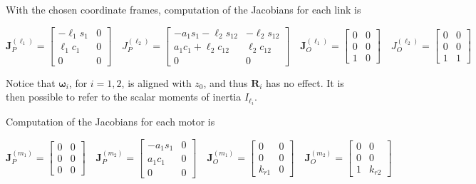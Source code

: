 \documentclass[10pt]{article}
\begin{document}
With the chosen coordinate frames, computation of the Jacobians for each link is

$$
\boldsymbol{J}_{P}^{\left(\ell_{1}\right)}=\left[\begin{array}{cc}
-\ell_{1} s_{1} & 0 \\
\ell_{1} c_{1} & 0 \\
0 & 0
\end{array}\right] \quad J_{P}^{\left(\ell_{2}\right)}=\left[\begin{array}{cc}
-a_{1} s_{1}-\ell_{2} s_{12} & -\ell_{2} s_{12} \\
a_{1} c_{1}+\ell_{2} c_{12} & \ell_{2} c_{12} \\
0 & 0
\end{array}\right]
\quad
\boldsymbol{J}_{O}^{\left(\ell_{1}\right)}=\left[\begin{array}{ll}
0 & 0 \\
0 & 0 \\
1 & 0
\end{array}\right] \quad J_{O}^{\left(\ell_{2}\right)}=\left[\begin{array}{ll}
0 & 0 \\
0 & 0 \\
1 & 1
\end{array}\right]
$$

Notice that $\boldsymbol{\omega}_{i}$, for $i=1,2$, is aligned with $z_{0}$, and thus $\boldsymbol{R}_{i}$ has no effect. It is then possible to refer to the scalar moments of inertia $I_{\ell_{i}}$.

Computation of the Jacobians for each motor is

$$
\boldsymbol{J}_{P}^{\left(m_{1}\right)}=\left[\begin{array}{cc}
0 & 0 \\
0 & 0 \\
0 & 0
\end{array}\right] \quad \boldsymbol{J}_{P}^{\left(m_{2}\right)}=\left[\begin{array}{cc}
-a_{1} s_{1} & 0 \\
a_{1} c_{1} & 0 \\
0 & 0
\end{array}\right]\quad
\boldsymbol{J}_{O}^{\left(m_{1}\right)}=\left[\begin{array}{cc}
0 & 0 \\
0 & 0 \\
k_{r 1} & 0
\end{array}\right] \quad \boldsymbol{J}_{O}^{\left(m_{2}\right)}=\left[\begin{array}{cc}
0 & 0 \\
0 & 0 \\
1 & k_{r 2}
\end{array}\right]
$$
\end{document}
